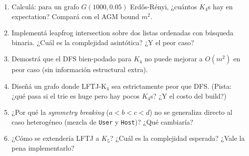 \begin{ejercicios}
\begin{enumerate}
    \item \starred{} Calculá: para un grafo \(G(1000, 0.05)\)
    Erdős-Rényi, ¿cuántos \(K_4\)s hay en expectation? Compará con
    el AGM bound \(m^2\).

    \item Implementá leapfrog intersection sobre dos listas
    ordenadas con búsqueda binaria. ¿Cuál es la complejidad
    asintótica? ¿Y el peor caso?

    \item \starred{} Demostrá que el DFS bien-podado para \(K_4\)
    no puede mejorar a \(O(m^2)\) en peor caso (sin información
    estructural extra).

    \item Diseñá un grafo donde LFTJ-K\(_4\) sea estrictamente peor
    que DFS. (Pista: ¿qué pasa si el trie es huge pero hay pocos
    \(K_4\)s? ¿Y el costo del build?)

    \item ¿Por qué la \emph{symmetry breaking} (\(a < b < c < d\))
    no se generaliza directo al caso heterogéneo (mezcla de
    \texttt{User} y \texttt{Host})? ¿Qué cambiaría?

    \item ¿Cómo se extendería LFTJ a \(K_5\)? ¿Cuál es la
    complejidad esperada? ¿Vale la pena implementarlo?
\end{enumerate}
\end{ejercicios}
